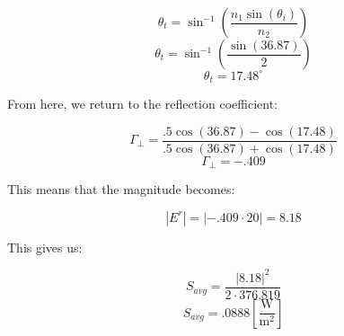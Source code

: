 \begin{enumerate}
\begin{enumerate}
        $$\theta_t=\sin^{-1}\left( \frac{n_1\sin(\theta_i)}{n_2} \right)$$
        $$\theta_t=\sin^{-1}\left( \frac{\sin(36.87)}{2} \right)$$
        $$\theta_t=17.48^{\circ}$$

        From here, we return to the reflection coefficient:

        $$\Gamma_{\perp}=\frac{.5\cos(36.87)-\cos(17.48)}{.5\cos(36.87)+\cos(17.48)}$$
        $$\Gamma_{\perp}=-.409$$

        This means that the magnitude becomes:

        $$|E^r|=|-.409\cdot20|=8.18$$

        This gives us:

        $$S_{avg}=\frac{|8.18|^2}{2\cdot376.819}$$
        $$\boxed{S_{avg}=.0888\left[ \frac{\si{\watt}}{\si{\meter\squared}} \right]}$$

    \end{enumerate}

\end{enumerate}



